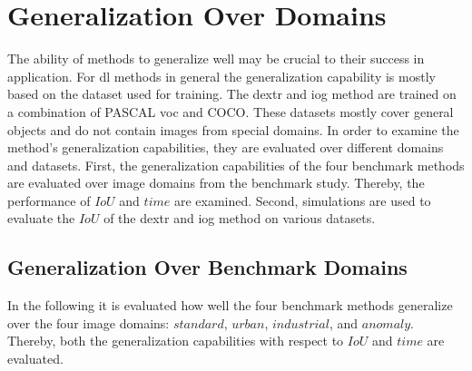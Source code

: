 
\section{Generalization Over Domains} \label{ord:ch5:sec2_generalization_image_domains}
The ability of methods to generalize well may be crucial to their success in application.
For \gls{dl} methods in general the generalization capability is mostly based on the dataset used for training.
The \gls{dextr} and \gls{iog} method are trained on a combination of PASCAL \gls{voc} and COCO.
These datasets mostly cover general objects and do not contain images from special domains.
In order to examine the method's generalization capabilities, they are evaluated over different domains and datasets.
First, the generalization capabilities of the four benchmark methods are evaluated over image domains from the benchmark study.
Thereby, the performance of $ IoU $ and $ time $ are examined.
Second, simulations are used to evaluate the $ IoU $ of the \gls{dextr} and \gls{iog} method on various datasets.

\subsection{Generalization Over Benchmark Domains}
In the following it is evaluated how well the four benchmark methods generalize over the four image domains: $ standard $, $ urban $, $ industrial $, and $ anomaly $.
Thereby, both the generalization capabilities with respect to $ IoU $ and $ time $ are evaluated.

